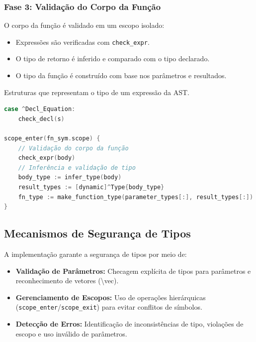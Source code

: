 \subsubsection*{Fase 3: Validação do Corpo da Função}
O corpo da função é validado em um escopo isolado:
\begin{itemize}
  \item Expressões são verificadas com \texttt{check\_expr}.
  \item O tipo de retorno é inferido e comparado com o tipo declarado.
  \item O tipo da função é construído com base nos parâmetros e resultados.
\end{itemize}

\begin{codigo}[htb]
    \caption{\small Estruturas que representam o tipo de um expressão da AST.}
    \label{cod-types-structs}
\begin{lstlisting}[language=C, numbers=none, frame=none, inputencoding=utf8]
case ^Decl_Equation:
    check_decl(s)

scope_enter(fn_sym.scope) {
    // Validação do corpo da função
    check_expr(body)
    // Inferência e validação de tipo
    body_type := infer_type(body)
    result_types := [dynamic]^Type{body_type}
    fn_type := make_function_type(parameter_types[:], result_types[:])
}
\end{lstlisting}
\end{codigo}

\subsection*{Mecanismos de Segurança de Tipos}

A implementação garante a segurança de tipos por meio de:
\begin{itemize}
  \item \textbf{Validação de Parâmetros:}  
  Checagem explícita de tipos para parâmetros e reconhecimento de vetores (\textbackslash{}vec).

  \item \textbf{Gerenciamento de Escopos:}  
  Uso de operações hierárquicas (\texttt{scope\_enter}/\texttt{scope\_exit}) para evitar conflitos de símbolos.

  \item \textbf{Detecção de Erros:}  
  Identificação de inconsistências de tipo, violações de escopo e uso inválido de parâmetros.
\end{itemize}

